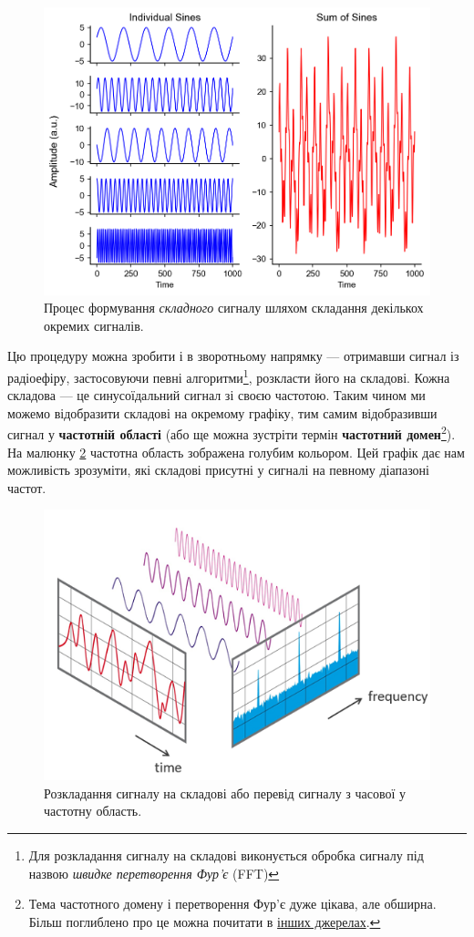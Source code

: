 \documentclass{article}
\begin{document}
\begin{figure}[h!]
\centering
\includegraphics[width=0.6\linewidth]{images/signals-sum.png}
\caption{\label{fig:signals-sum}Процес формування \textit{складного} сигналу шляхом складання декількох окремих сигналів.}
\end{figure}

Цю процедуру можна зробити і в зворотньому напрямку --- отримавши сигнал із радіоефіру, застосовуючи певні алгоритми\footnote{Для розкладання сигналу на складові виконується обробка сигналу під назвою \textit{швидке перетворення Фур'є} (FFT)}, розкласти його на складові. Кожна складова — це синусоїдальний сигнал зі своєю частотою. Таким чином ми можемо відобразити складові на окремому графіку, тим самим відобразивши сигнал у \textbf{частотній області} (або ще можна зустріти термін \textbf{частотний домен}\footnote{Тема частотного домену і перетворення Фур'є дуже цікава, але обширна. Більш поглиблено про це можна почитати в \href{https://pysdr.org/ukraine/content-ukraine/frequency_domain.html}{інших джерелах}.}). На малюнку \ref{fig:freq-domain} частотна область зображена голубим кольором. Цей графік дає нам можливість зрозуміти, які складові присутні у сигналі на певному діапазоні частот.

\begin{figure}[h!]
\centering
\includegraphics[width=0.7\linewidth]{images/freq-domain.png}
\caption{\label{fig:freq-domain}Розкладання сигналу на складові або перевід сигналу з часової у частотну область.}
\end{figure}
\end{document}
